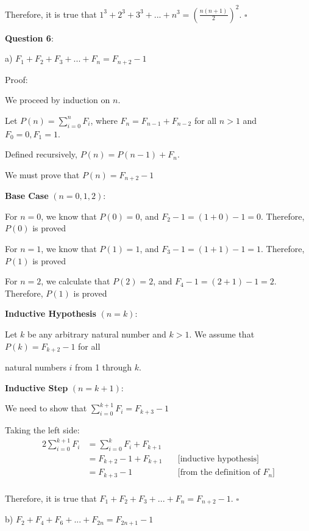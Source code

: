 \documentclass{article} %
\newcommand{\question}[2][]{\begin{flushleft}
        \textbf{Question #1}: #2

\end{flushleft}}
\begin{document}
    Therefore, it is true that $1^3 + 2^3 + 3^3 + ... + n^3 = (\frac{n(n+1)}{2})^2$. $\square$

    \newpage

    \question[6]{}

    a) $F_1 + F_2 + F_3 + ... + F_n = F_{n + 2} - 1$

    Proof: 
    
    We proceed by induction on $n$.

    Let $P(n) = \sum_{i = 0}^{n} F_i$, where $F_n = F_{n - 1} + F_{n - 2}$ for all $n > 1$ and $F_0 = 0, F_1 = 1$.

    Defined recursively, $P(n) = P(n - 1) + F_n$.

    We must prove that $P(n) = F_{n + 2} - 1$

    \textbf{Base Case} $(n = 0, 1, 2)$:

    For $n = 0$, we know that $P(0) = 0$, and $F_2 - 1 = (1 + 0) - 1 = 0$. Therefore, $P(0)$ is proved

    For $n = 1$, we know that $P(1) = 1$, and $F_3 - 1 = (1 + 1) - 1 = 1$. Therefore, $P(1)$ is proved

    For $n = 2$, we calculate that $P(2) = 2$, and $F_4 - 1 = (2 + 1) - 1 = 2$. Therefore, $P(1)$ is proved

    \textbf{Inductive Hypothesis} $(n = k)$:

    Let $k$ be any arbitrary natural number and $k > 1$. We assume that $P(k) = F_{k+2} - 1$ for all
    
    natural numbers $i$ from 1 through $k$.

    \textbf{Inductive Step} $(n = k+1)$:

    We need to show that $\sum_{i = 0}^{k+1} F_i = F_{k + 3} - 1$

    Taking the left side:
    \begin{alignat*}{2}
        \sum_{i = 0}^{k+1} F_i &= \sum_{i = 0}^{k} F_i + F_{k + 1}\\
        &= F_{k + 2} - 1 + F_{k + 1}\ &&\text{[inductive hypothesis]}\\
        &= F_{k + 3} - 1 &&\text{[from the definition of $F_n$]}\\
    \end{alignat*}
    
    Therefore, it is true that $F_1 + F_2 + F_3 + ... + F_n = F_{n + 2} - 1$. $\square$

    \newpage

    b) $F_2 + F_4 + F_6 + ... + F_{2n} = F_{2n + 1} - 1$
\end{document}
